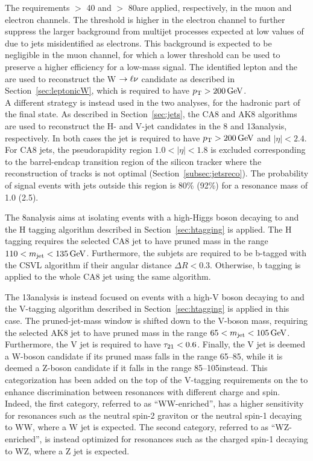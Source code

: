 The requirements \ETmiss $>$ 40 and $>$ 80\GeV are applied, respectively, in the muon and electron channels.
The threshold is higher in the electron channel to further suppress the larger background from multijet processes expected at low values of \ETmiss due to jets misidentified as electrons.
This background is expected to be negligible in the muon channel, for which a lower \ETmiss threshold can be used to preserve a higher efficiency for a low-mass signal.
The identified lepton and the \ETmiss are used to reconstruct the W $\rightarrow\ell\nu$ candidate as described in Section~\ref{sec:leptonicW},
which is required to have $p_{\mathrm{T}} > 200\,\text{Ge\hspace{-.08em}V}$.\\

A different strategy is instead used in the two analyses, for the hadronic part of the final state.
As described in Section~\ref{sec:jets}, the CA8 and AK8 algorithms are used to reconstruct the H- and V-jet candidates in the 8 and 13\TeV analysis, respectively.
In both cases the jet is required to have $p_{\mathrm{T}} > 200\,\text{Ge\hspace{-.08em}V}$ and $|\eta| < 2.4$. %
For CA8 jets, the pseudorapidity region $1.0 < |\eta| < 1.8$ is excluded corresponding to the barrel-endcap transition region of the silicon tracker where the reconstruction of tracks is not optimal (Section~\ref{subsec:jetsreco}).
The probability of signal events with jets outside this region is 80\% (92\%) for a resonance mass of 1.0 (2.5)\TeV.

The 8\TeV analysis aims at isolating events with a high-\pt Higgs boson decaying to \bbbar and the H tagging algorithm described in Section~\ref{sec:htagging} is applied.
The H tagging requires the selected CA8 jet to have pruned mass in the range $110 < m_{\text{jet}} < 135\,\text{Ge\hspace{-.08em}V}$. Furthermore, the subjets are required to be b-tagged with the CSVL algorithm if their angular distance $\Delta R < 0.3$.
Otherwise, b tagging is applied to the whole CA8 jet using the same algorithm.

The 13\TeV analysis is instead focused on events with a high-\pt V boson decaying to \qqbar and the V-tagging algorithm described in Section~\ref{sec:htagging} is applied in this case.
The pruned-jet-mass window is shifted down to the V-boson mass, requiring the selected AK8 jet to have pruned mass in the range $65 < m_{\text{jet}} < 105\,\text{Ge\hspace{-.08em}V}$.
Furthermore, the V jet is required to have $\tau_{21} < 0.6$.
Finally, the V jet is deemed a W-boson candidate if its pruned mass falls in the range 65--85\GeV, while it is deemed a Z-boson candidate if it falls in the range 85--105\GeV instead.
This categorization has been added on the top of the V-tagging requirements on the \mJ to enhance discrimination between resonances with different charge and spin. 
Indeed, the first category, referred to as  ``WW-enriched'', has a higher sensitivity for resonances such as the neutral spin-2 graviton or the neutral spin-1 \Zpr decaying to WW, where a W jet is expected.
The second category, referred to as ``WZ-enriched'', is instead optimized for resonances such as the charged spin-1 \Wpr decaying to WZ, where a Z jet is expected.\\


